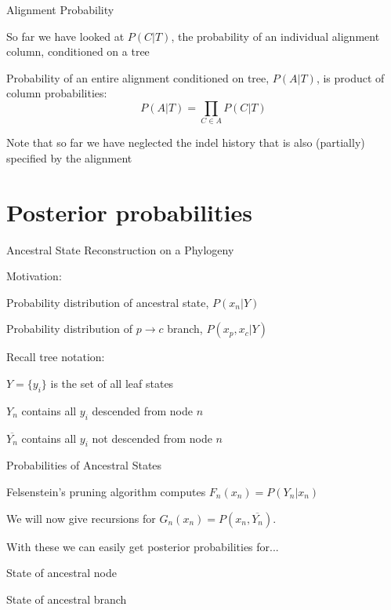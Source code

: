 \documentclass{beamer}
\begin{document}
\begin{frame}{Alignment Probability}

\itemb

\item So far we have looked at $P(C|T)$, the probability of an individual alignment column, conditioned on a tree
\item Probability of an entire alignment conditioned on tree, $P(A|T)$, is product of column probabilities:
\[
P(A|T) = \prod_{C \in A} P(C|T)
\]
\item Note that so far we have neglected the indel history that is also (partially) specified by the alignment
\iteme

\end{frame}

\section{Posterior probabilities}

\begin{frame}{Ancestral State Reconstruction on a Phylogeny}

\itemb
\item Motivation:
 \itemb
 \item Probability distribution of ancestral state, $P(x_n|Y)$
 \item Probability distribution of $p \to c$ branch, $P(x_p,x_c|Y)$
 \iteme
\item Recall tree notation:
 \itemb
 \item $Y = \{ y_i \}$ is the set of all leaf states
 \item $Y_n$ contains all $y_i$ descended from node $n$
 \item $\overline{Y_n}$ contains all $y_i$ \alert{not} descended from node $n$
 \iteme
\iteme

\end{frame}

\begin{frame}{Probabilities of Ancestral States}

\itemb
 \item Felsenstein's pruning algorithm computes $F_n(x_n) = P(Y_n|x_n)$
 \item We will now give recursions for $G_n(x_n) = P(x_n,\overline{Y_n})$.
 \item With these we can easily get posterior probabilities for...
  \itemb
  \item State of ancestral node
  \item State of ancestral branch
  \iteme
\iteme

\end{frame}
\end{document}
